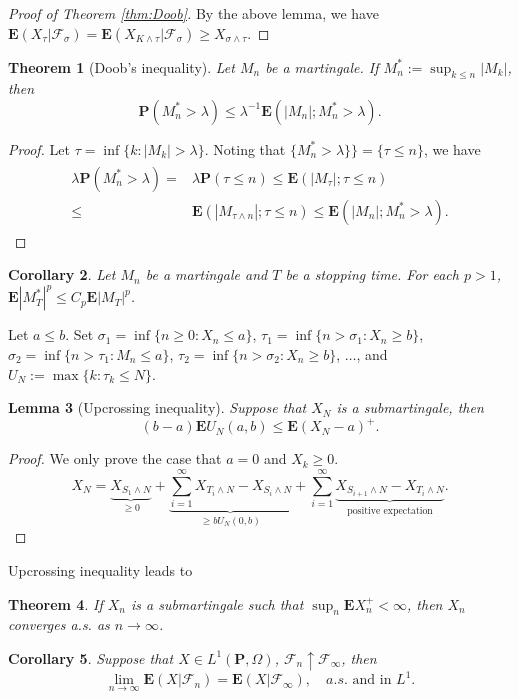 \documentclass[twoside, 12pt]{book}
\numberwithin{equation}{chapter}
\newtheorem{theorem}{Theorem}[section]
\newtheorem{lemma}[theorem]{Lemma}
\newtheorem{corollary}[theorem]{Corollary}
\def\cF{{\mathcal F}}
\def\bE{{\mathbf E}}
\def\bP{{\mathbf P}}
\def\geq{\geqslant}
\def\leq{\leqslant}
\begin{document}
	\begin{proof}[Proof of Theorem \ref{thm:Doob}]
		By the above lemma, we have $\bE (X_{\tau}|\cF_{\sigma})=\bE (X_{K\wedge \tau}|\cF_{\sigma})\geq X_{\sigma\wedge \tau}$.  
	\end{proof}
	\begin{theorem}[Doob's inequality]\label{Thm-Doob-Max}
		Let $M_n$ be a martingale. If $M_n^*:=\sup_{k\leq n} |M_k|$, then 
		$$
		\bP(M^*_n>\lambda) \leq \lambda^{-1} \bE (|M_n|;M_n^*>\lambda). 
		$$
	\end{theorem}
	\begin{proof}
		Let $\tau=\inf\{k: |M_k|>\lambda\}$.  Noting that $\{M^*_n>\lambda\}\}=\{\tau \leq n\}$, we have 
		\begin{align*}
			\begin{aligned}
				\lambda \bP (M^*_n>\lambda)=&\lambda \bP(\tau\leq n)\leq \bE(|M_\tau|;\tau\leq n)\\
				\leq &\bE (|M_{\tau 
					\wedge n}|; \tau\leq n) \leq  \bE(|M_n|; M_n^*>\lambda). 
			\end{aligned}
		\end{align*}
	\end{proof}
	
	\begin{corollary}\label{Cor-Lp}
		Let $M_n$ be a martingale and $T$ be a stopping time. For each $p>1$, $\bE |M_T^*|^p \leq C_p \bE |M_T|^p$. 
	\end{corollary}
	
	 Let $a\leq b$. Set $\sigma_1=\inf\{n\geq 0: X_n\leq a\}$, $\tau_1= \inf\{n>\sigma_1: X_n\geq b\}$, $\sigma_2=\inf\{n>\tau_1: M_n\leq a\}$, $\tau_2= \inf\{n>\sigma_2: X_n\geq b\}$, $\dots$, and 
	$U_N:= \max\{k: \tau_k\leq N\}$. 
	\begin{lemma}[Upcrossing inequality]
		Suppose that $X_N$ is a submartingale, then 
		\[
		(b-a)\bE U_N(a,b) \leq \bE (X_{N}-a)^+. 
		\]
	\end{lemma}
	\begin{proof}
		We only prove the case that $a=0$ and $X_k\geq 0$. 
		\[
		X_N=\underbrace{X_{S_1\wedge N}}_{\geq 0}+\underbrace{\sum_{i=1}^\infty X_{T_i\wedge N}-X_{S_i\wedge N}}_{\geq bU_N(0,b)}+ \sum_{i=1}^\infty \underbrace{X_{S_{i+1}\wedge N}-X_{T_i\wedge N}}_{\mbox{positive expectation}}. 
		\] 
	\end{proof}
	Upcrossing inequality leads to 
	\begin{theorem}
		If $X_n$ is a submartingale such that $\sup_{n} \bE X_n^{+}<\infty$, then $X_n$ converges a.s. as $n\to \infty$. 
	\end{theorem}
	\begin{corollary}\label{Cor-convergence}
		Suppose that $X\in L^1(\bP, \Omega)$, $\cF_n\uparrow \cF_\infty$, then 
		\[
		\lim_{n\to\infty}\bE (X|\cF_n) = \bE (X|\cF_\infty),\quad a.s. \mbox{ and in } L^1. 
		\]
	\end{corollary}
\end{document}

